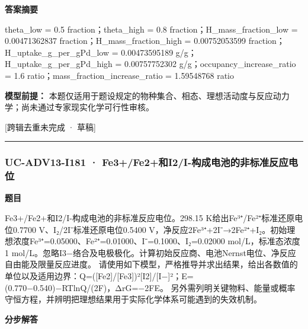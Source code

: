 \documentclass[UTF8,11pt,a4paper]{ctexart}
\begin{document}
\noindent\textbf{答案摘要}\par
theta\_low = 0.5 fraction；theta\_high = 0.8 fraction；H\_mass\_fraction\_low = 0.00471362837 fraction；H\_mass\_fraction\_high = 0.00752053599 fraction；H\_uptake\_g\_per\_gPd\_low = 0.00473595189 g/g；H\_uptake\_g\_per\_gPd\_high = 0.00757752302 g/g；occupancy\_increase\_ratio = 1.6 ratio；mass\_fraction\_increase\_ratio = 1.59548768 ratio\par
\noindent\textbf{模型前提：}
本题仅适用于题设规定的物种集合、相态、理想活动度与反应动力学；尚未通过专家现实化学可行性审核。\par
\noindent\textcolor{red!65!black}{[跨辑去重未完成 · 草稿]} \par
\medskip\hrule\medskip
{}
\subsubsection*{UC-ADV13-I181 · Fe3+/Fe2+和I2/I-构成电池的非标准反应电位}
\noindent\textbf{题目}\par
Fe3+/Fe2+和I2/I-构成电池的非标准反应电位。298.15 K给出Fe³⁺/Fe²⁺标准还原电位0.7700 V、I₂/2I⁻标准还原电位0.5400 V，净反应2Fe³⁺+2I⁻→2Fe²⁺+I₂。初始理想浓度Fe³⁺=0.05000、Fe²⁺=0.01000、I⁻=0.1000、I₂=0.02000 mol/L，标准态浓度1 mol/L。忽略I3−络合及电极极化。计算初始反应商、电池Nernst电位、净反应自由能及限量反应进度。 请使用如下模型，严格推导并求出结果，给出各数值的单位以及适用边界：Q=([Fe2]/[Fe3])²[I2]/[I−]²；E=(0.770−0.540)−RTlnQ/(2F)，ΔrG=−2FE。 另外需列明关键物料、能量或概率守恒方程，并辨明把理想结果用于实际化学体系可能遇到的失效机制。\par
\medskip\noindent\textbf{分步解答}
\end{document}
